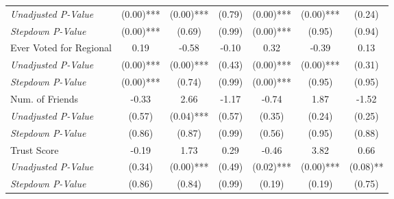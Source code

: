 \begin{tabular}{l c c c c c c}
\quad \textit{Unadjusted P-Value} & (0.00)*** & (0.00)*** & (0.79) & (0.00)*** & (0.00)*** & (0.24) \\
\quad \textit{Stepdown P-Value} & (0.00)*** & (0.69) & (0.99) & (0.00)*** & (0.95) & (0.94) \\
Ever Voted for Regional & 0.19 & -0.58 & -0.10 & 0.32 & -0.39 & 0.13 \\
\quad \textit{Unadjusted P-Value} & (0.00)*** & (0.00)*** & (0.43) & (0.00)*** & (0.00)*** & (0.31) \\
\quad \textit{Stepdown P-Value} & (0.00)*** & (0.74) & (0.99) & (0.00)*** & (0.95) & (0.95) \\
Num. of Friends & -0.33 & 2.66 & -1.17 & -0.74 & 1.87 & -1.52 \\
\quad \textit{Unadjusted P-Value} & (0.57) & (0.04)*** & (0.57) & (0.35) & (0.24) & (0.25) \\
\quad \textit{Stepdown P-Value} & (0.86) & (0.87) & (0.99) & (0.56) & (0.95) & (0.88) \\
Trust Score & -0.19 & 1.73 & 0.29 & -0.46 & 3.82 & 0.66 \\
\quad \textit{Unadjusted P-Value} & (0.34) & (0.00)*** & (0.49) & (0.02)*** & (0.00)*** & (0.08)** \\
\quad \textit{Stepdown P-Value} & (0.86) & (0.84) & (0.99) & (0.19) & (0.19) & (0.75) \\
\bottomrule
\end{tabular}
